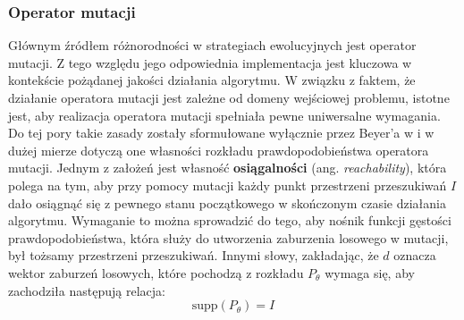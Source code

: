 \subsubsection{Operator mutacji}
\label{subsubsec:es-conv}

    Głównym źródłem różnorodności w strategiach ewolucyjnych jest operator mutacji. Z tego względu jego odpowiednia implementacja jest kluczowa w kontekście pożądanej jakości działania algorytmu. W związku z faktem, że działanie operatora mutacji jest zależne od
    domeny wejściowej problemu, istotne jest, aby realizacja operatora mutacji spełniała pewne uniwersalne wymagania. Do tej pory takie zasady zostały sformułowane wyłącznie przez Beyer'a w \source i w dużej mierze dotyczą one własności rozkładu prawdopodobieństwa operatora mutacji. Jednym z założeń jest własność \textbf{osiągalności} (ang. \textit{reachability}), która polega na tym, aby przy pomocy mutacji każdy punkt przestrzeni przeszukiwań $I$ dało osiągnąć się z pewnego stanu początkowego w skończonym czasie działania algorytmu. Wymaganie to można sprowadzić do tego, aby nośnik funkcji gęstości prawdopodobieństwa, która służy do utworzenia zaburzenia losowego w mutacji, był tożsamy przestrzeni przeszukiwań. Innymi słowy, zakładając, że $d$ oznacza wektor zaburzeń losowych, które pochodzą z rozkładu $P_{\theta}$ wymaga się, aby zachodziła następują relacja:
    \begin{equation}
        \label{eq:es-supp}
        \text{supp}\left(P_{\theta}\right) = I
    \end{equation}
    
